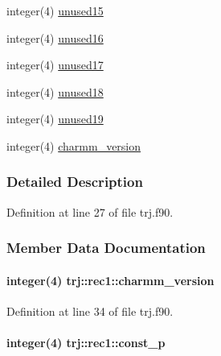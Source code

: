\begin{DoxyCompactItemize}
\item 
integer(4) \hyperlink{structtrj_1_1rec1_ade279b99f743cafda7469a84f0fde466}{unused15}
\item 
integer(4) \hyperlink{structtrj_1_1rec1_a629a4fafc322975e7102aa323047067e}{unused16}
\item 
integer(4) \hyperlink{structtrj_1_1rec1_a8cb53e63f1ca0f3648e5c50f663b5b13}{unused17}
\item 
integer(4) \hyperlink{structtrj_1_1rec1_a0722aa58645af7bf87f8af57cdb6b2de}{unused18}
\item 
integer(4) \hyperlink{structtrj_1_1rec1_abb239d4dc4924a374ca7edaa85105aa9}{unused19}
\item 
integer(4) \hyperlink{structtrj_1_1rec1_a60285c4fa68ede054f71960d4c25d50a}{charmm\-\_\-version}
\end{DoxyCompactItemize}


\subsubsection{Detailed Description}


Definition at line 27 of file trj.\-f90.



\subsubsection{Member Data Documentation}
\hypertarget{structtrj_1_1rec1_a60285c4fa68ede054f71960d4c25d50a}{
\paragraph[{charmm\-\_\-version}]{\setlength{\rightskip}{0pt plus 5cm}integer(4) trj\-::rec1\-::charmm\-\_\-version\hspace{0.3cm}{\ttfamily [private]}}}\label{structtrj_1_1rec1_a60285c4fa68ede054f71960d4c25d50a}


Definition at line 34 of file trj.\-f90.

\hypertarget{structtrj_1_1rec1_aff034e7e787ec026066401a2946f262d}{
\paragraph[{const\-\_\-p}]{\setlength{\rightskip}{0pt plus 5cm}integer(4) trj\-::rec1\-::const\-\_\-p\hspace{0.3cm}{\ttfamily [private]}}}\label{structtrj_1_1rec1_aff034e7e787ec026066401a2946f262d}


